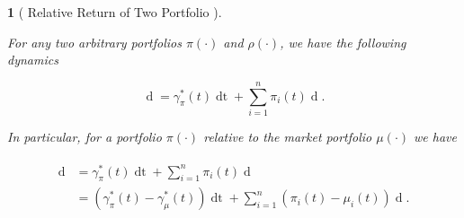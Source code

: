 \documentclass[british]{amsart} \usepackage{lmodern}
\numberwithin{equation}{section} \numberwithin{figure}{section}
\theoremstyle{plain} \newtheorem{thm}{\protect\theoremname}[section]
\theoremstyle{definition} \newtheorem{defn}[thm]{\protect\definitionname}
\theoremstyle{plain} \newtheorem{assumption}[thm]{\protect\assumptionname}
\theoremstyle{plain} \newtheorem{lem}[thm]{\protect\lemmaname}
\theoremstyle{plain} \newtheorem{prop}[thm]{\protect\propositionname}
\theoremstyle{remark} \newtheorem{rem}[thm]{\protect\remarkname}
\theoremstyle{plain} \newtheorem{cor}[thm]{\protect\corollaryname}
\renewcommand{\d}[1]{\mathop{\mathrm{d}{#1}}}
\begin{document}
\begin{lem} 
  [
    {\cite[Lemma 3.2]{fernholz2009}}
    Relative Return of Two Portfolio
  ]
  \label{lem:relativereturnoftwoportfolios}

  For any two arbitrary portfolios $\pi(\cdot)$ and $\rho(\cdot)$, we have the
  following dynamics

  \begin{equation}    
    \label{eq:rrdynamics} 
      \d{\log{ \left( \frac{ V^{\pi}(t) }{V^{\rho}(t) } \right) } } = 
        \gamma_{\pi}^{*}(t)\d{t} + 
         \sum_{i=1}^{n} \pi_{i}(t) 
            \d{\log{ \left( \frac{ X_{i}(t) }{ V^{\rho}(t)} \right) }}. 
  \end{equation}

  In particular, for a portfolio $\pi(\cdot)$ relative to the market portfolio
  $\mu(\cdot)$ we have

  \begin{gather} 
    \label{eq:rrdynamics2} 
    \begin{split} 
      \d{ \log{ \left( \frac{V^{\pi}(t) }{ V^{\mu}(t) } \right) } } 
      &= \gamma_{\pi}^{*}(t)\d{t} + 
            \sum_{i=1}^{n} \pi_{i}(t)  \d{ \log{\mu_{i}(t)} } \\ 
      &= (\gamma_{\pi}^{*}(t) - \gamma_{\mu}^{*}(t)) \d{t} +
            \sum_{i=1}^{n} (\pi_{i}(t) - \mu_{i}(t)) \d{\log{\mu_{i}(t)} }.
    \end{split} 
  \end{gather}

\end{lem}
\end{document}
